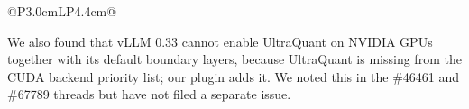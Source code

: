 \documentclass[11pt]{article}
\begin{document}
\begin{table}[!htb]
\begin{tabularx}{\linewidth}{@{}P{3.0cm}LP{4.4cm}@{}}
\bottomrule
\end{tabularx}
\end{table}

We also found that vLLM 0.33 cannot enable UltraQuant on NVIDIA GPUs together with its default boundary layers, because UltraQuant is missing from the CUDA backend priority list; our plugin adds it. We noted this in the \#46461 and \#67789 threads but have not filed a separate issue.



\end{document}
